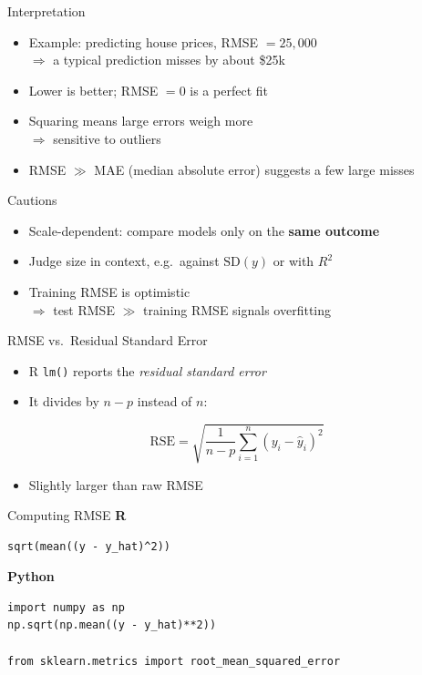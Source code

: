 \documentclass[aspectratio=43,11pt]{beamer}
\begin{document}
\begin{frame}{Interpretation}
  \begin{itemize}
    \item Example: predicting house prices, RMSE $= 25{,}000$\\
          $\Rightarrow$ a typical prediction misses by about \$25k
    \item Lower is better; RMSE $= 0$ is a perfect fit
    \item Squaring means large errors weigh more\\
          $\Rightarrow$ sensitive to outliers
    \item RMSE $\gg$ MAE (median absolute error) suggests a few large misses
  \end{itemize}
\end{frame}

\begin{frame}{Cautions}
  \begin{itemize}
    \item Scale-dependent: compare models only on the \textbf{same outcome}
    \item Judge size in context, e.g.\ against $\text{SD}(y)$ or with $R^2$
    \item Training RMSE is optimistic\\
          $\Rightarrow$ test RMSE $\gg$ training RMSE signals overfitting
  \end{itemize}
\end{frame}

\begin{frame}{RMSE vs.\ Residual Standard Error}
  \begin{itemize}
    \item R \texttt{lm()} reports the \textit{residual standard error}
    \item It divides by $n - p$ instead of $n$:
  \end{itemize}
  \[
    \text{RSE} = \sqrt{\frac{1}{n-p}\sum_{i=1}^{n}\left(y_i - \hat{y}_i\right)^2}
  \]
  \begin{itemize}
    \item Slightly larger than raw RMSE
  \end{itemize}
\end{frame}

\begin{frame}[fragile]{Computing RMSE}
  \textbf{R}
\begin{lstlisting}
sqrt(mean((y - y_hat)^2))
\end{lstlisting}
  \vspace{1em}
  \textbf{Python}
\begin{lstlisting}
import numpy as np
np.sqrt(np.mean((y - y_hat)**2))

from sklearn.metrics import root_mean_squared_error
\end{lstlisting}
\end{frame}
\end{document}
